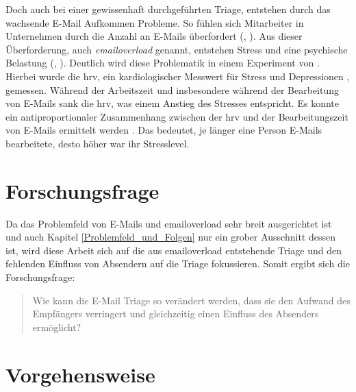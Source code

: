 Doch auch bei einer gewissenhaft durchgeführten Triage, entstehen durch das wachsende E-Mail Aufkommen Probleme. So fühlen sich Mitarbeiter in Unternehmen durch die Anzahl an E-Mails überfordert (\cite[S. 179]{Dawley2003}, \cite[S. 264 f.]{Thomas2006}). Aus dieser Überforderung, auch \emph{\gls{emailoverload}} genannt, entstehen Stress und eine psychische Belastung (\cite[S. 117]{Lagrana2016}, \cite[S. 331]{Eppler2004}). Deutlich wird diese Problematik in einem Experiment von \cite{Mark2016}. Hierbei wurde die \acrfull{hrv}, ein kardiologischer Messwert für Stress und Depressionen \citep[S. 881]{Vrijkotte2000}, gemessen. Während der Arbeitszeit und insbesondere während der Bearbeitung von E-Mails sank die \acrshort{hrv}, was einem Anstieg des Stresses entspricht. Es konnte ein antiproportionaler Zusammenhang zwischen der \acrshort{hrv} und der Bearbeitungszeit von E-Mails ermittelt werden \citep[S. 1724]{Mark2016}. Das bedeutet, je länger eine Person E-Mails bearbeitete, desto höher war ihr Stresslevel. 



\section{Forschungsfrage}

Da das Problemfeld von E-Mails und \gls{emailoverload} sehr breit ausgerichtet ist und auch Kapitel \ref{Problemfeld_und_Folgen} nur ein grober Ausschnitt dessen ist, wird diese Arbeit sich auf die aus \gls{emailoverload} entstehende Triage und den fehlenden Einfluss von Absendern auf die Triage fokussieren. Somit ergibt sich die Forschungsfrage: 

\begin{quotation}
	\noindent Wie kann die E-Mail Triage so verändert werden, dass sie den Aufwand des Empfängers verringert und gleichzeitig einen Einfluss des Absenders ermöglicht?
\end{quotation}


\section{Vorgehensweise}

